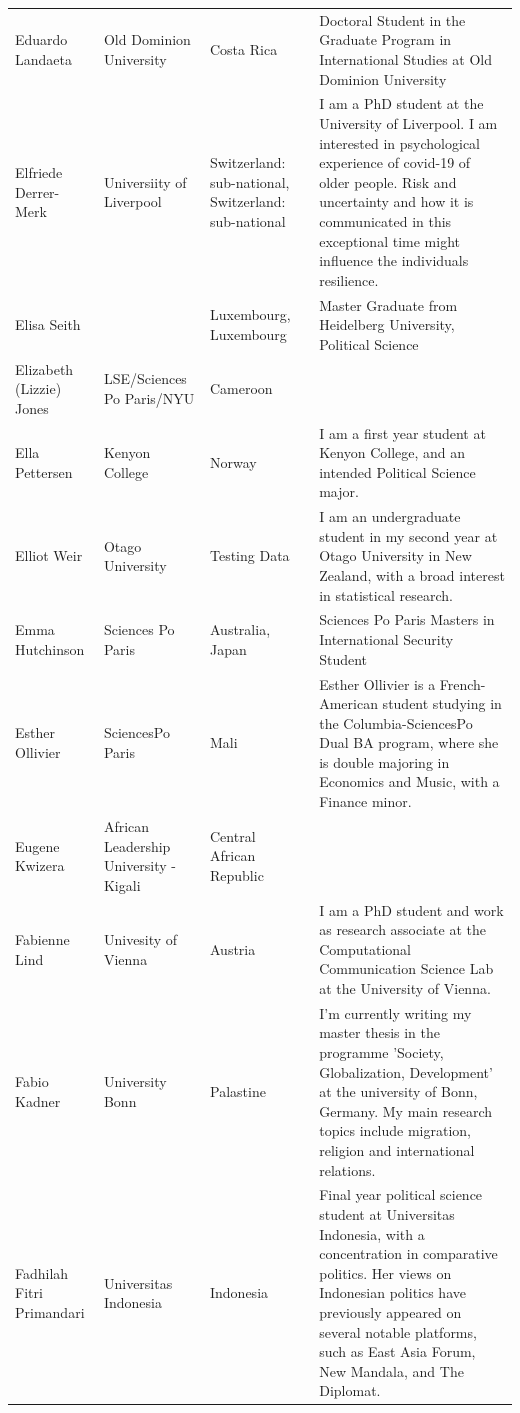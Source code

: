 \documentclass[
]{article}
\begin{document}
\begin{longtable}[t]{l>{\raggedright\arraybackslash}p{2cm}>{\raggedright\arraybackslash}p{2cm}>{\raggedright\arraybackslash}p{3cm}}
\rowcolor{gray!6}  Eduardo Landaeta & Old Dominion University & Costa Rica & Doctoral Student in the Graduate Program in International Studies at Old Dominion University\\
Elfriede Derrer-Merk & Universiity of Liverpool & Switzerland: sub-national, Switzerland: sub-national & I am a PhD student at the University of Liverpool. I am interested in psychological experience of covid-19 of older people. Risk and uncertainty and how it is communicated in this exceptional time might influence the individuals resilience.\\
\rowcolor{gray!6}  Elisa Seith &  & Luxembourg, Luxembourg & Master Graduate from Heidelberg University, Political Science\\
Elizabeth (Lizzie) Jones & LSE/Sciences Po Paris/NYU & Cameroon & \\
\addlinespace
\rowcolor{gray!6}  Ella Pettersen & Kenyon College & Norway & I am a first year student at Kenyon College, and an intended Political Science major.\\
Elliot Weir & Otago University & Testing Data & I am an undergraduate student in my second year at Otago University in New Zealand, with a broad interest in statistical research.\\
\rowcolor{gray!6}  Emma Hutchinson & Sciences Po Paris & Australia, Japan & Sciences Po Paris Masters in International Security Student\\
Esther Ollivier & SciencesPo Paris & Mali & Esther Ollivier is a French-American student studying in the Columbia-SciencesPo Dual BA program, where she is double majoring in Economics and Music, with a Finance minor.\\
\rowcolor{gray!6}  Eugene Kwizera & African Leadership University - Kigali & Central African Republic & \\
\addlinespace
Fabienne Lind & Univesity of Vienna & Austria & I am a PhD student and work as research associate at the Computational Communication Science Lab at the University of Vienna.\\
\rowcolor{gray!6}  Fabio Kadner & University Bonn & Palastine & I'm currently writing my master thesis in the programme 'Society, Globalization, Development' at the university of Bonn, Germany. My main research topics include migration, religion and international relations.\\
Fadhilah Fitri Primandari & Universitas Indonesia & Indonesia & Final year political science student at Universitas Indonesia, with a concentration in comparative politics. Her views on Indonesian politics have previously appeared on several notable platforms, such as East Asia Forum, New Mandala, and The Diplomat.\\

\end{longtable}
\end{document}
